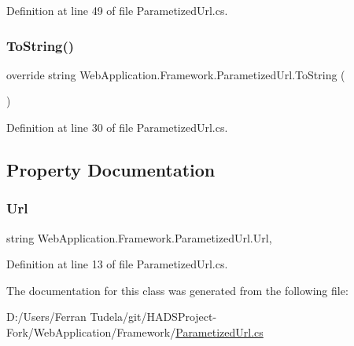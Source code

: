 Definition at line 49 of file Parametized\+Url.\+cs.

\mbox{\label{classWebApplication_1_1Framework_1_1ParametizedUrl_a683634894d4a0b4afea0ce3054d5e035}} 
\subsubsection{\texorpdfstring{ToString()}{ToString()}}
{\footnotesize\ttfamily override string Web\+Application.\+Framework.\+Parametized\+Url.\+To\+String (\begin{DoxyParamCaption}{ }\end{DoxyParamCaption})}



Definition at line 30 of file Parametized\+Url.\+cs.



\subsection{Property Documentation}
\mbox{\label{classWebApplication_1_1Framework_1_1ParametizedUrl_a34be3576c697a64fb6dcc2cc00cb799c}} 
\subsubsection{\texorpdfstring{Url}{Url}}
{\footnotesize\ttfamily string Web\+Application.\+Framework.\+Parametized\+Url.\+Url\hspace{0.3cm}{\ttfamily [get]}, {\ttfamily [set]}}



Definition at line 13 of file Parametized\+Url.\+cs.



The documentation for this class was generated from the following file\+:\begin{DoxyCompactItemize}
\item 
D\+:/\+Users/\+Ferran Tudela/git/\+H\+A\+D\+S\+Project-\/\+Fork/\+Web\+Application/\+Framework/\mbox{\hyperlink{ParametizedUrl_8cs}{Parametized\+Url.\+cs}}\end{DoxyCompactItemize}
